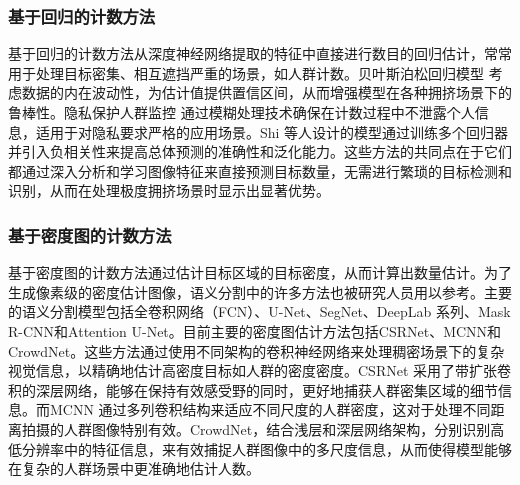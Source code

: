 \subsubsection{基于回归的计数方法}
基于回归的计数方法\cite{2022Crowddetectionanalysissurveillancevideosusingdeeplearning}\cite{2008PrivacypreservingcrowdmonitoringCountingpeoplepeoplemodelstracking}\cite{2009BayesianPoissonRegressionCrowdCounting}从深度神经网络提取的特征中直接进行数目的回归估计，常常用于处理目标密集、相互遮挡严重的场景，如人群计数。贝叶斯泊松回归模型\cite{2009BayesianPoissonRegressionCrowdCounting} 考虑数据的内在波动性，为估计值提供置信区间，从而增强模型在各种拥挤场景下的鲁棒性。隐私保护人群监控\cite{2008PrivacypreservingcrowdmonitoringCountingpeoplepeoplemodelstracking} 通过模糊处理技术确保在计数过程中不泄露个人信息，适用于对隐私要求严格的应用场景。Shi 等人\cite{2018CrowdCountingDeepNegativeCorrelationLearning}设计的模型通过训练多个回归器并引入负相关性来提高总体预测的准确性和泛化能力。这些方法的共同点在于它们都通过深入分析和学习图像特征来直接预测目标数量，无需进行繁琐的目标检测和识别，从而在处理极度拥挤场景时显示出显著优势。
\subsubsection{基于密度图的计数方法}
基于密度图的计数方法通过估计目标区域的目标密度，从而计算出数量估计。为了生成像素级的密度估计图像，语义分割中的许多方法也被研究人员用以参考。主要的语义分割模型包括全卷积网络（FCN）\cite{2015FullyConvolutionalNetworksSemanticSegmentation}、U-Net\cite{ronnebergerUNetConvolutionalNetworks2015}、SegNet\cite{2016SegNetDeepConvolutionalEncoderDecoderArchitectureImageSegmentation}、DeepLab\cite{2016SemanticImageSegmentationDeepConvolutionalNetsFullyConnectedCRFs} \cite{2017DeepLabSemanticImageSegmentationDeepConvolutionalNetsAtrousConvolutionFullyConnectedCRFs}\cite{2017RethinkingAtrousConvolutionSemanticImageSegmentation}系列、Mask R-CNN\cite{2018MaskRCNN}和Attention U-Net\cite{oktayAttentionUNetLearning2018}。目前主要的密度图估计方法包括CSRNet\cite{2018CSRNetDilatedConvolutionalNeuralNetworksUnderstandingHighlyCongestedScenesa}、MCNN\cite{2016SingleImageCrowdCountingMultiColumnConvolutionalNeuralNetwork}和CrowdNet\cite{2016CrowdNetDeepConvolutionalNetworkDenseCrowdCounting}。这些方法通过使用不同架构的卷积神经网络来处理稠密场景下的复杂视觉信息，以精确地估计高密度目标如人群的密度密度。CSRNet 采用了带扩张卷积的深层网络，能够在保持有效感受野的同时，更好地捕获人群密集区域的细节信息。而MCNN 通过多列卷积结构来适应不同尺度的人群密度，这对于处理不同距离拍摄的人群图像特别有效。CrowdNet，结合浅层和深层网络架构，分别识别高低分辨率中的特征信息，来有效捕捉人群图像中的多尺度信息，从而使得模型能够在复杂的人群场景中更准确地估计人数。

